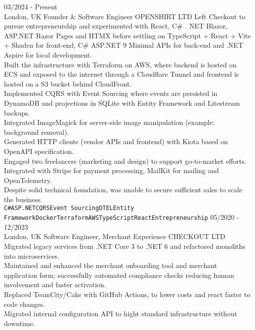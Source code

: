\documentclass[9pt]{lib/developercv} %
\begin{document}
\begin{entrylist}
	\entry
		{03/2024 - Present\\\footnotesize{London, UK}}
		{Founder \& Software Engineer}
		{OPENSHIRT LTD}
		{
			Left Checkout to pursue entrepreneurship and experimented with React, C\# . NET Blazor, ASP.NET Razor Pages and HTMX before settling on TypeScript + React + Vite + Shadcn for front-end, C\# ASP.NET 9 Minimal APIs for back-end and .NET Aspire for local development.\\
			Built the infrastructure with Terraform on AWS, where backend is hosted on ECS and exposed to the internet through a Cloudflare Tunnel and frontend is hosted on a S3 bucket behind CloudFront.\\
			Implemented CQRS with Event Sourcing where events are persisted in DynamoDB and projections in SQLite with Entity Framework and Litestream backups.\\
			Integrated ImageMagick for server-side image manipulation (example: background removal).\\
			Generated HTTP clients (vendor APIs and frontend) with Kiota based on OpenAPI specification.\\
			Engaged two freelancers (marketing and design) to support go-to-market efforts.\\
			Integrated with Stripe for payment processing, MailKit for mailing and OpenTelemetry.\\
			Despite solid technical foundation, was unable to secure sufficient sales to scale the business.\\
			\texttt{C\#}\slashsep\texttt{ASP.NET}\slashsep\texttt{CQRS}\slashsep\texttt{Event Sourcing}\slashsep\texttt{OTEL}\slashsep\texttt{Entity Framework}\slashsep\texttt{Docker}\slashsep\texttt{Terraform}\slashsep\texttt{AWS}\slashsep\texttt{TypeScript}\slashsep\texttt{React}\slashsep\texttt{Entrepreneurship}
		}
	\entry
		{05/2020 - 12/2023\\\footnotesize{London, UK}}
		{Software Engineer, Merchant Experience}
		{CHECKOUT LTD}
		{
			Migrated legacy services from .NET Core 3 to .NET 6 and refactored monoliths into microservices.\\
			Maintained and enhanced the merchant onboarding tool and merchant application form; successfully automated compliance checks reducing human involvement and faster activation.\\
			Replaced TeamCity/Cake with GitHub Actions, to lower costs and react faster to code changes.\\
			Migrated internal configuration API to hight standard infrastructure without downtime.\\
}
\end{entrylist}
\end{document}
